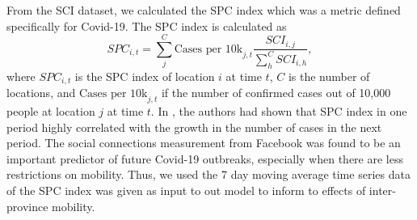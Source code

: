 From the \gls{SCI} dataset, we calculated the \gls{SPC} index \cite{kuchlerGeographicSpreadCOVID192020} which was a metric defined specifically for Covid-19.
The \gls{SPC} index is calculated as
\begin{equation*}
    SPC_{i,t} = \sum_j^C \text{Cases per 10k}_{j,t} \frac{SCI_{i,j}}{\sum_h^C SCI_{i,h}},
\end{equation*}
where $SPC_{i,t}$ is the \gls{SPC} index of location $i$ at time $t$, $C$ is the number of locations, and $\text{Cases per 10k}_{j,t}$ if the number of confirmed cases out of 10,000 people at location $j$ at time $t$.
In \cite{kuchlerGeographicSpreadCOVID192020}, the authors had shown that \gls{SPC} index in one period highly correlated with the growth in the number of cases in the next period.
The social connections measurement from Facebook was found to be an important predictor of future Covid-19 outbreaks, especially when there are less restrictions on mobility.
Thus, we used the 7 day moving average time series data of the \gls{SPC} index was given as input to out model to inform to effects of inter-province mobility.
